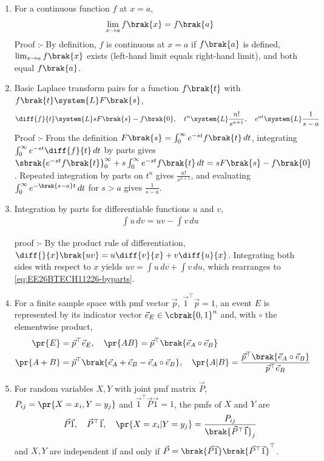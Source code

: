 \begin{enumerate}[label=\thesubsection.\arabic*, ref=\thesubsection.\theenumi]
\item For a continuous function $f$ at $x = a$,
\begin{align}
	\lim_{x \to a} f\brak{x} = f\brak{a}
	\label{eq:EE26BTECH11226-cont}
\end{align}
Proof :- By definition, $f$ is continuous at $x = a$ if $f\brak{a}$ is defined, $\lim_{x \to a} f\brak{x}$ exists (left-hand limit equals right-hand limit), and both equal $f\brak{a}$.
\item Basic Laplace transform pairs for a function $f\brak{t}$ with $f\brak{t} \system{L} F\brak{s}$,
\begin{align}
	\diff{f}{t} \system{L} sF\brak{s} - f\brak{0}, \quad
	t^n \system{L} \frac{n!}{s^{n+1}}, \quad
	e^{at} \system{L} \frac{1}{s-a}
	\label{eq:EE26BTECH11226-laplace}
\end{align}
Proof :- From the definition $F\brak{s} = \int_0^{\infty} e^{-st} f\brak{t}\,dt$, integrating $\int_0^{\infty} e^{-st}\diff{f}{t}\,dt$ by parts gives $\sbrak{e^{-st}f\brak{t}}_0^{\infty} + s\int_0^{\infty} e^{-st}f\brak{t}\,dt = sF\brak{s} - f\brak{0}$. Repeated integration by parts on $t^n$ gives $\frac{n!}{s^{n+1}}$, and evaluating $\int_0^{\infty} e^{-\brak{s-a}t}\,dt$ for $s > a$ gives $\frac{1}{s-a}$.
\item Integration by parts for differentiable functions $u$ and $v$,
\begin{align}
	\int u\,dv = uv - \int v\,du
	\label{eq:EE26BTECH11226-byparts}
\end{align}

proof :- By the product rule of differentiation, $\diff{}{x}\brak{uv} = u\diff{v}{x} + v\diff{u}{x}$. Integrating both sides with respect to $x$ yields $uv = \int u\,dv + \int v\,du$, which rearranges to \eqref{eq:EE26BTECH11226-byparts}.
\item For a finite sample space with pmf vector $\vec{p}$, $\vec{1}^{\top}\vec{p} = 1$, an event $E$ is represented by its indicator vector $\vec{e}_E \in \cbrak{0,1}^n$ and, with $\circ$ the elementwise product,
\begin{align}
	\pr{E} &= \vec{p}^{\top}\vec{e}_E, \quad \pr{AB} = \vec{p}^{\top}\brak{\vec{e}_A\circ\vec{e}_B}
	\\
	\pr{A+B} &= \vec{p}^{\top}\brak{\vec{e}_A+\vec{e}_B-\vec{e}_A\circ\vec{e}_B}, \quad
	\pr{A\vert B} = \frac{\vec{p}^{\top}\brak{\vec{e}_A\circ\vec{e}_B}}{\vec{p}^{\top}\vec{e}_B}
	\label{eq:EE26BTECH11226-pmf-vec}
\end{align}
\item For random variables $X, Y$ with joint pmf matrix $\vec{P}$, $P_{ij} = \pr{X=x_i, Y=y_j}$ and $\vec{1}^{\top}\vec{P}\vec{1} = 1$, the pmfs of $X$ and $Y$ are
\begin{align}
	\vec{P}\vec{1}, \quad \vec{P}^{\top}\vec{1}, \quad
	\pr{X=x_i\vert Y=y_j} = \frac{P_{ij}}{\brak{\vec{P}^{\top}\vec{1}}_j}
	\label{eq:EE26BTECH11226-pmf-joint}
\end{align}
and $X, Y$ are independent if and only if $\vec{P} = \brak{\vec{P}\vec{1}}\brak{\vec{P}^{\top}\vec{1}}^{\top}$.
\end{enumerate}
